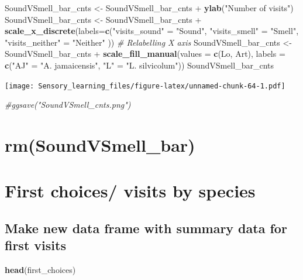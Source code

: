\documentclass[]{article}
\newenvironment{Shaded}{\begin{snugshade}}{\end{snugshade}}
\newcommand{\KeywordTok}[1]{\textcolor[rgb]{0.13,0.29,0.53}{\textbf{{#1}}}}
\newcommand{\DataTypeTok}[1]{\textcolor[rgb]{0.13,0.29,0.53}{{#1}}}
\newcommand{\StringTok}[1]{\textcolor[rgb]{0.31,0.60,0.02}{{#1}}}
\newcommand{\CommentTok}[1]{\textcolor[rgb]{0.56,0.35,0.01}{\textit{{#1}}}}
\newcommand{\NormalTok}[1]{{#1}}
\begin{document}
\begin{Shaded}
\begin{Highlighting}[]
\NormalTok{SoundVSmell_bar_cnts <-}\StringTok{ }\NormalTok{SoundVSmell_bar_cnts +}\StringTok{ }\KeywordTok{ylab}\NormalTok{(}\StringTok{"Number of visits"}\NormalTok{)}
\NormalTok{SoundVSmell_bar_cnts <-}\StringTok{ }\NormalTok{SoundVSmell_bar_cnts +}\StringTok{ }\KeywordTok{scale_x_discrete}\NormalTok{(}\DataTypeTok{labels=}\KeywordTok{c}\NormalTok{(}\StringTok{"visits_sound"} \NormalTok{=}\StringTok{ "Sound"}\NormalTok{, }\StringTok{"visits_smell"} \NormalTok{=}\StringTok{ "Smell"}\NormalTok{,}
                              \StringTok{"visits_neither"} \NormalTok{=}\StringTok{ "Neither"} \NormalTok{))  }\CommentTok{# Relabelling X axis}
\NormalTok{SoundVSmell_bar_cnts <-}\StringTok{ }\NormalTok{SoundVSmell_bar_cnts +}\StringTok{ }\KeywordTok{scale_fill_manual}\NormalTok{(}\DataTypeTok{values =} \KeywordTok{c}\NormalTok{(Lo, Art), }\DataTypeTok{labels =} \KeywordTok{c}\NormalTok{(}\StringTok{"AJ"} \NormalTok{=}\StringTok{ "A. jamaicensis"}\NormalTok{, }\StringTok{"L"} \NormalTok{=}\StringTok{ "L. silvicolum"}\NormalTok{))}
\NormalTok{SoundVSmell_bar_cnts}
\end{Highlighting}
\end{Shaded}

\texttt{[image: Sensory\_learning\_files/figure-latex/unnamed-chunk-64-1.pdf]}

\begin{Shaded}
\begin{Highlighting}[]
\CommentTok{#ggsave("SoundVSmell_cnts.png")}
\end{Highlighting}
\end{Shaded}

\section{rm(SoundVSmell\_bar)}\label{rmsoundvsmell_bar}

\section{First choices/ visits by
species}\label{first-choices-visits-by-species-2}

\subsection{Make new data frame with summary data for first
visits}\label{make-new-data-frame-with-summary-data-for-first-visits-2}

\begin{Shaded}
\begin{Highlighting}[]
\KeywordTok{head}\NormalTok{(first_choices)}
\end{Highlighting}
\end{Shaded}
\end{document}
